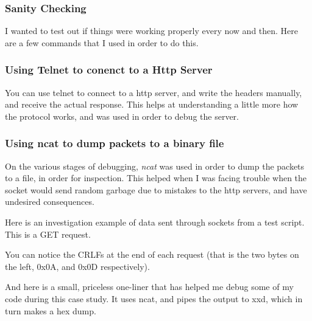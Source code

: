 \subsubsection{Sanity Checking}
I wanted to test out if things were working properly every now and then. Here are a few commands that I used in order to do this.

\subsubsection{Using Telnet to conenct to a Http Server}
You can use telnet to connect to a http server, and write the headers manually, and receive the actual response. This helps at understanding a little more how the protocol works, and was used in order to debug the server.
\\


\subsubsection{Using ncat to dump packets to a binary file}
On the various stages of debugging, \textit{ncat} was used in order to dump the packets to a file, in order for inspection. This helped when I was facing trouble when the socket would send random garbage due to mistakes to the http servers, and have undesired consequences. 



Here is an investigation example of data sent through sockets from a test script. This is a GET request.

You can notice the CRLFs at the end of each request (that is the two bytes on the left, 0x0A, and 0x0D respectively).

And here is a small, priceless one-liner that has helped me debug some of my code during this case study. It uses ncat, and pipes the output to xxd, which in turn makes a hex dump.



